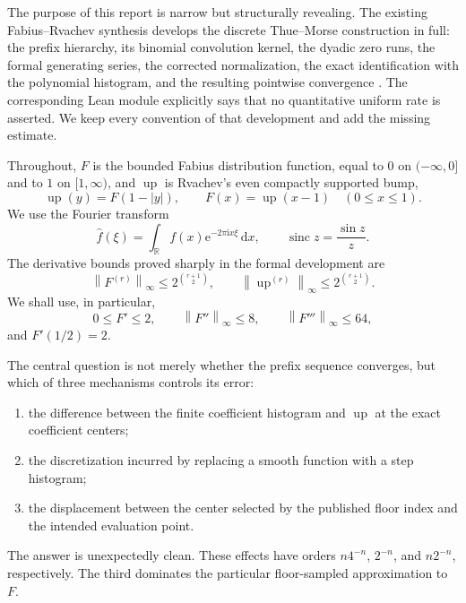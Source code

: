 \documentclass[11pt,oneside]{article}
\theoremstyle{definition}
\theoremstyle{remark}
\newcommand{\R}{\mathbb R}
\newcommand{\Up}{\operatorname{up}}
\newcommand{\sinc}{\operatorname{sinc}}
\newcommand{\e}{\mathrm e}
\newcommand{\ii}{\mathrm i}
\newcommand{\dd}{\,\mathrm d}
\newcommand{\norm}[1]{\left\lVert #1\right\rVert}
\begin{document}
The purpose of this report is narrow but structurally revealing.  The existing
Fabius--Rvachev synthesis develops the discrete Thue--Morse construction in full:
the prefix hierarchy, its binomial convolution kernel, the dyadic zero runs, the
formal generating series, the corrected normalization, the exact identification
with the polynomial histogram, and the resulting pointwise convergence
\cite{proveit,synthesis}.  The corresponding Lean module
 explicitly says that no quantitative uniform
rate is asserted.  We keep every convention of that development and add the
missing estimate.

Throughout, $F$ is the bounded Fabius distribution function, equal to $0$ on
$(-\infty,0]$ and to $1$ on $[1,\infty)$, and $\Up$ is Rvachev's even compactly
supported bump,
\begin{equation}
 \Up(y)=F(1-|y|),\qquad
 F(x)=\Up(x-1)\quad(0\le x\le1).                 \label{eq:fold}
\end{equation}
We use the Fourier transform
\begin{equation}
 \widehat f(\xi)=\int_{\R}f(x)\e^{-2\pi\ii x\xi}\dd x,
 \qquad \sinc z=\frac{\sin z}{z}.               \label{eq:fourier-convention}
\end{equation}
The derivative bounds proved sharply in the formal development are
\begin{equation}
 \norm{F^{(r)}}_\infty\le 2^{\binom{r+1}{2}},
 \qquad
 \norm{\Up^{(r)}}_\infty\le 2^{\binom{r+1}{2}}.  \label{eq:derivative-bounds}
\end{equation}
We shall use, in particular,
\begin{equation}
 0\le F'\le2,
 \qquad \norm{F''}_\infty\le8,
 \qquad \norm{F'''}_\infty\le64,                \label{eq:low-derivative-bounds}
\end{equation}
and $F'(1/2)=2$.

The central question is not merely whether the prefix sequence converges, but
which of three mechanisms controls its error:
\begin{enumerate}
\item the difference between the finite coefficient histogram and $\Up$ at the
      exact coefficient centers;
\item the discretization incurred by replacing a smooth function with a step
      histogram;
\item the displacement between the center selected by the published floor index
      and the intended evaluation point.
\end{enumerate}
The answer is unexpectedly clean.  These effects have orders
$ n4^{-n}$, $2^{-n}$, and $n2^{-n}$, respectively.  The third dominates the
particular floor-sampled approximation to $F$.
\end{document}
